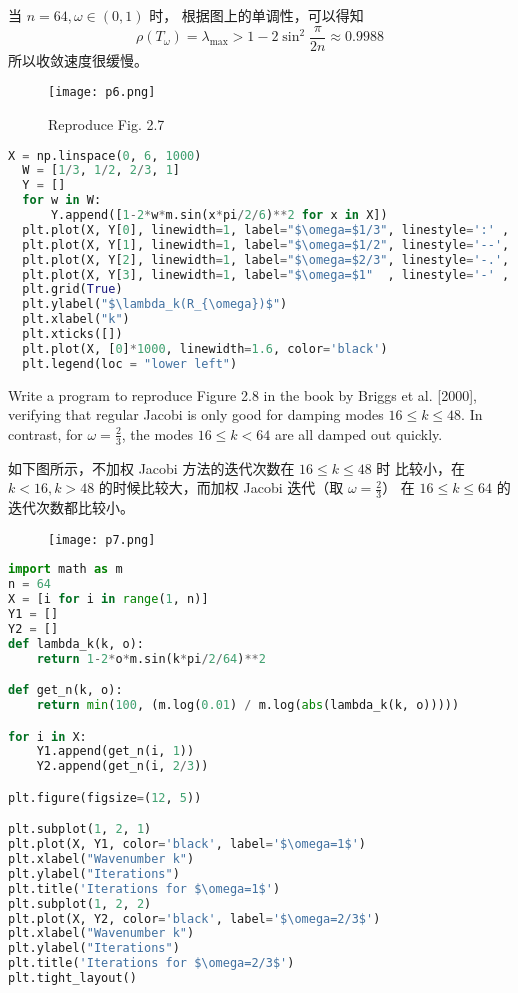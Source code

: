 \documentclass[lang=cn,a4paper,newtx,bibend=bibtex]{elegantpaper}
\begin{document}
\begin{solution}
  当 $n = 64, \omega \in (0, 1)$ 时，
  根据图上的单调性，可以得知
  \[
    \rho(T_{\omega}) = \lambda_{\max} > 1 - 2 \sin^2\frac{\pi}{2n} \approx 0.9988
  \]
  所以收敛速度很缓慢。
\begin{figure}[H]
  \centering
  \texttt{[image: p6.png]}
  \caption{Reproduce Fig. 2.7}
\end{figure}

\begin{lstlisting}[language=python]
  X = np.linspace(0, 6, 1000)
  W = [1/3, 1/2, 2/3, 1]
  Y = []
  for w in W:
      Y.append([1-2*w*m.sin(x*pi/2/6)**2 for x in X])
  plt.plot(X, Y[0], linewidth=1, label="$\omega=$1/3", linestyle=':' , color = 'black')    
  plt.plot(X, Y[1], linewidth=1, label="$\omega=$1/2", linestyle='--', color = 'black')
  plt.plot(X, Y[2], linewidth=1, label="$\omega=$2/3", linestyle='-.', color = 'black')
  plt.plot(X, Y[3], linewidth=1, label="$\omega=$1"  , linestyle='-' , color = 'black')
  plt.grid(True)
  plt.ylabel("$\lambda_k(R_{\omega})$")
  plt.xlabel("k")
  plt.xticks([])
  plt.plot(X, [0]*1000, linewidth=1.6, color='black')
  plt.legend(loc = "lower left")
\end{lstlisting}

\end{solution}

\begin{prob}[Exercise 9.21]
  Write a program to reproduce Figure 2.8
  in the book by Briggs et al. [2000], verifying that regular
  Jacobi is only good for damping modes $16 \le k \le 48$. In
  contrast, for $\omega = \frac23$, 
  the modes $16 \le k < 64$ are all damped out quickly.
\end{prob}

\begin{solution}
如下图所示，不加权 Jacobi 方法的迭代次数在 $16 \le k \le 48$ 时
比较小，在 $k<16,k>48$ 的时候比较大，而加权 Jacobi 迭代（取 $\omega = \frac23$）
在 $16 \le k \le 64$ 的迭代次数都比较小。

\begin{figure}[H]
\centering
\texttt{[image: p7.png]}
\end{figure}
\begin{lstlisting}[language=python]
import math as m
n = 64
X = [i for i in range(1, n)]
Y1 = []
Y2 = []
def lambda_k(k, o):
    return 1-2*o*m.sin(k*pi/2/64)**2

def get_n(k, o):
    return min(100, (m.log(0.01) / m.log(abs(lambda_k(k, o)))))

for i in X:
    Y1.append(get_n(i, 1))
    Y2.append(get_n(i, 2/3))

plt.figure(figsize=(12, 5))

plt.subplot(1, 2, 1)
plt.plot(X, Y1, color='black', label='$\omega=1$')
plt.xlabel("Wavenumber k")
plt.ylabel("Iterations")
plt.title('Iterations for $\omega=1$')
plt.subplot(1, 2, 2)
plt.plot(X, Y2, color='black', label='$\omega=2/3$')
plt.xlabel("Wavenumber k")
plt.ylabel("Iterations")
plt.title('Iterations for $\omega=2/3$')
plt.tight_layout()
\end{lstlisting}

\end{solution}
\end{document}
